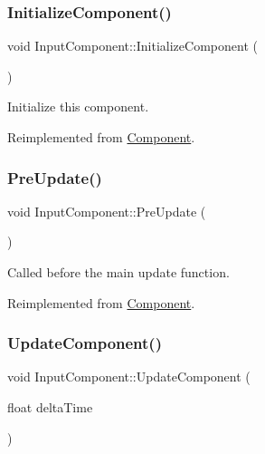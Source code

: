 \subsubsection{\texorpdfstring{Initialize\+Component()}{InitializeComponent()}}
{\footnotesize\ttfamily void Input\+Component\+::\+Initialize\+Component (\begin{DoxyParamCaption}{ }\end{DoxyParamCaption})\hspace{0.3cm}{\ttfamily [virtual]}}

Initialize this component. 

Reimplemented from \mbox{\hyperlink{class_component_a65053e7e92ff6344e6b028111e43c3c9}{Component}}.

\mbox{\label{class_input_component_a99f431a305362899b8a6682b390c8899}} 
\subsubsection{\texorpdfstring{Pre\+Update()}{PreUpdate()}}
{\footnotesize\ttfamily void Input\+Component\+::\+Pre\+Update (\begin{DoxyParamCaption}{ }\end{DoxyParamCaption})\hspace{0.3cm}{\ttfamily [virtual]}}

Called before the main update function. 

Reimplemented from \mbox{\hyperlink{class_component_a7866088cbcf6713821951955eadc85ce}{Component}}.

\mbox{\label{class_input_component_a42d3b0dffbedfd8cf62702096780ed4d}} 
\subsubsection{\texorpdfstring{Update\+Component()}{UpdateComponent()}}
{\footnotesize\ttfamily void Input\+Component\+::\+Update\+Component (\begin{DoxyParamCaption}\item[{float}]{delta\+Time }\end{DoxyParamCaption})\hspace{0.3cm}{\ttfamily [virtual]}}

